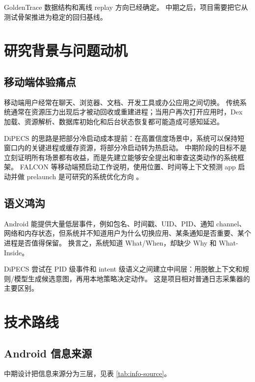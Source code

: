 \documentclass[12pt,a4paper]{article}
\begin{document}
GoldenTrace 数据结构和离线 replay 方向已经确定。
中期之后，项目需要把它从测试骨架推进为稳定的回归基线。

\section{研究背景与问题动机}\label{sec:motivation}

\subsection{移动端体验痛点}\label{subsec:pain-point}

移动端用户经常在聊天、浏览器、文档、开发工具或办公应用之间切换。
传统系统通常在资源压力出现后才被动回收或重建进程；当用户再次打开应用时，Dex 加载、资源解析、数据库初始化和后台状态恢复都可能造成可感知延迟。

DiPECS 的思路是把部分冷启动成本提前：在高置信度场景中，系统可以保持短窗口内的关键进程或缓存资源，将部分冷启动转为热启动。
中期阶段的目标不是立刻证明所有场景都有收益，而是先建立能够安全提出和审查这类动作的系统框架。
FALCON 等移动端预启动工作说明，使用位置、时间等上下文预测 app 启动并做 prelaunch 是可研究的系统优化方向 \cite{falcon}。

\subsection{语义鸿沟}\label{subsec:semantic-gap}

Android 能提供大量低层事件，例如包名、时间戳、UID、PID、通知 channel、网络和内存状态，但系统并不知道用户为什么切换应用、某条通知是否重要、某个进程是否值得保留。
换言之，系统知道 What/When，却缺少 Why 和 What-Inside。

DiPECS 尝试在 PID 级事件和 intent 级语义之间建立中间层：用脱敏上下文和规则/模型生成候选意图，再用本地策略决定动作。
这是项目相对普通日志采集器的主要区别。

\section{技术路线}\label{sec:roadmap}

\subsection{Android 信息来源}\label{subsec:info-source}

中期设计把信息来源分为三层，见表 \ref{tab:info-source}。
\end{document}
